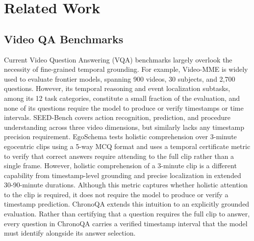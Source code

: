 \documentclass[sigconf,natbib=false,nonacm]{acmart}
\begin{document}
\section{Related Work}

\subsection{Video QA Benchmarks}
Current Video Question Answering (VQA) benchmarks largely overlook the necessity of fine-grained temporal grounding. For example, Video-MME \cite{videomme} is widely used to evaluate frontier models, spanning 900 videos, 30 subjects, and 2,700 questions. However, its temporal reasoning and event localization subtasks, among its 12 task categories, constitute a small fraction of the evaluation, and none of its questions require the model to produce or verify timestamps or time intervals. SEED-Bench \cite{seedbench} covers action recognition, prediction, and procedure understanding across three video dimensions, but similarly lacks any timestamp precision requirement. EgoSchema \cite{egoschema} tests holistic comprehension over 3-minute egocentric clips using a 5-way MCQ format and uses a temporal certificate metric to verify that correct answers require attending to the full clip rather than a single frame. However, holistic comprehension of a 3-minute clip is a different capability from timestamp-level grounding and precise localization in extended 30-90-minute durations. Although this metric captures whether holistic attention to the clip is required, it does not require the model to produce or verify a timestamp prediction. ChronoQA extends this intuition to an explicitly grounded evaluation. Rather than certifying that a question requires the full clip to answer, every question in ChronoQA carries a verified timestamp interval that the model must identify alongside its answer selection.
\end{document}
